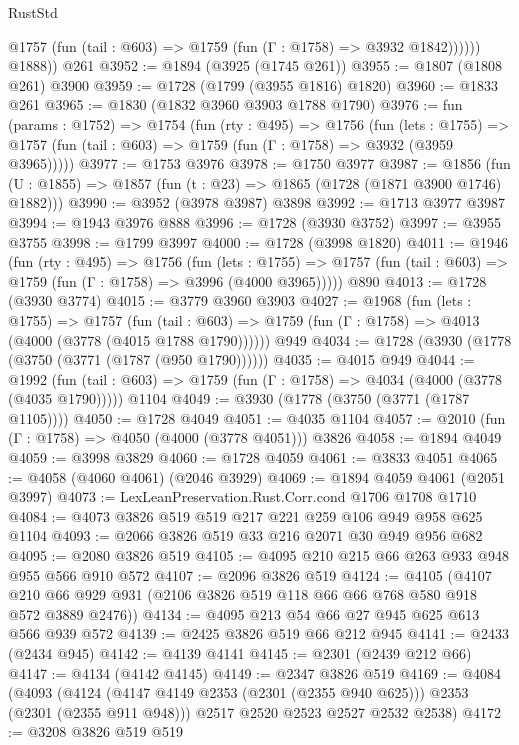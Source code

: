 \begin{lexlean}{RustStd}
\begin{coremodule}
{\begin{coremodule}
{{{{{{{{{{{{{              @1757 (fun (tail : @603) => @1759 (fun (Γ : @1758) => @3932 @1842))))))
        @1888))
    @261
@3952 := @1894 (@3925 (@1745 @261))
@3955 := @1807 (@1808 @261) @3900
@3959 := @1728 (@1799 (@3955 @1816) @1820)
@3960 := @1833 @261
@3965 := @1830 (@1832 @3960 @3903 @1788 @1790)
@3976 := fun (params : @1752) =>
  @1754
    (fun (rty : @495) =>
    @1756
      (fun (lets : @1755) =>
      @1757 (fun (tail : @603) => @1759 (fun (Γ : @1758) => @3932 (@3959 @3965)))))
@3977 := @1753 @3976
@3978 := @1750 @3977
@3987 := @1856 (fun (U : @1855) => @1857 (fun (t : @23) => @1865 (@1728 (@1871 @3900 @1746) @1882)))
@3990 := @3952 (@3978 @3987) @3898
@3992 := @1713 @3977 @3987
@3994 := @1943 @3976 @888
@3996 := @1728 (@3930 @3752)
@3997 := @3955 @3755
@3998 := @1799 @3997
@4000 := @1728 (@3998 @1820)
@4011 := @1946
    (fun (rty : @495) =>
    @1756
      (fun (lets : @1755) =>
      @1757 (fun (tail : @603) => @1759 (fun (Γ : @1758) => @3996 (@4000 @3965)))))
    @890
@4013 := @1728 (@3930 @3774)
@4015 := @3779 @3960 @3903
@4027 := @1968
    (fun (lets : @1755) =>
    @1757
      (fun (tail : @603) => @1759 (fun (Γ : @1758) => @4013 (@4000 (@3778 (@4015 @1788 @1790))))))
    @949
@4034 := @1728 (@3930 (@1778 (@3750 (@3771 (@1787 (@950 @1790))))))
@4035 := @4015 @949
@4044 := @1992
    (fun (tail : @603) => @1759 (fun (Γ : @1758) => @4034 (@4000 (@3778 (@4035 @1790)))))
    @1104
@4049 := @3930 (@1778 (@3750 (@3771 (@1787 @1105))))
@4050 := @1728 @4049
@4051 := @4035 @1104
@4057 := @2010 (fun (Γ : @1758) => @4050 (@4000 (@3778 @4051))) @3826
@4058 := @1894 @4049
@4059 := @3998 @3829
@4060 := @1728 @4059
@4061 := @3833 @4051
@4065 := @4058 (@4060 @4061) (@2046 @3929)
@4069 := @1894 @4059 @4061 (@2051 @3997)
@4073 := LexLeanPreservation.Rust.Corr.cond @1706 @1708 @1710
@4084 := @4073 @3826 @519 @519 @217 @221 @259 @106 @949 @958 @625 @1104
@4093 := @2066 @3826 @519 @33 @216 @2071 @30 @949 @956 @682
@4095 := @2080 @3826 @519
@4105 := @4095 @210 @215 @66 @263 @933 @948 @955 @566 @910 @572
@4107 := @2096 @3826 @519
@4124 := @4105
    (@4107 @210 @66 @929 @931 (@2106 @3826 @519 @118 @66 @66 @768 @580 @918 @572 @3889 @2476))
@4134 := @4095 @213 @54 @66 @27 @945 @625 @613 @566 @939 @572
@4139 := @2425 @3826 @519 @66 @212 @945
@4141 := @2433 (@2434 @945)
@4142 := @4139 @4141
@4145 := @2301 (@2439 @212 @66)
@4147 := @4134 (@4142 @4145)
@4149 := @2347 @3826 @519
@4169 := @4084
    (@4093
      (@4124 (@4147 @4149 @2353 (@2301 (@2355 @940 @625))) @2353 (@2301 (@2355 @911 @948)))
      @2517
      @2520
      @2523
      @2527
      @2532
      @2538)
@4172 := @3208 @3826 @519 @519
}}}}}}}}}}}}}
\end{coremodule}}
\end{coremodule}
\end{lexlean}
